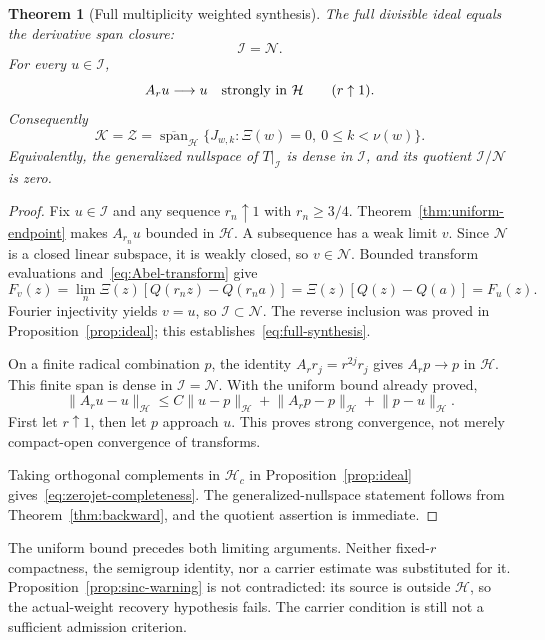 \documentclass[11pt,a4paper]{article}
\numberwithin{equation}{section}
\newtheorem{theorem}{Theorem}[section]
\theoremstyle{definition}
\theoremstyle{remark}
\newcommand{\Hh}{\mathcal H}
\newcommand{\Nn}{\mathcal N}
\newcommand{\Ii}{\mathcal I}
\newcommand{\Zz}{\mathcal Z}
\newcommand{\Kk}{\mathcal K}
\newcommand{\norm}[1]{\lVert #1\rVert}
\newcommand{\cl}{\overline{\operatorname{span}}}
\begin{document}
\begin{theorem}[Full multiplicity weighted synthesis]\label{thm:full-synthesis}
The full divisible ideal equals the derivative span closure:
\begin{equation}\label{eq:full-synthesis}
 \Ii=\Nn.
\end{equation}
For every $u\in\Ii$,
\begin{equation}\label{eq:strong-Abel}
 A_ru\longrightarrow u\quad\hbox{strongly in }\Hh
 \qquad(r\uparrow1).
\end{equation}
Consequently
\begin{equation}\label{eq:zerojet-completeness}
 \Kk=\Zz
 =\cl_{\Hh}\{J_{w,k}:\Xi(w)=0,\ 0\le k<\nu(w)\}.
\end{equation}
Equivalently, the generalized nullspace of $T|_{\Ii}$ is dense in $\Ii$, and its quotient $\Ii/\Nn$ is zero.
\end{theorem}
\begin{proof}
Fix $u\in\Ii$ and any sequence $r_n\uparrow1$ with $r_n\ge3/4$. Theorem~\ref{thm:uniform-endpoint} makes $A_{r_n}u$ bounded in $\Hh$. A subsequence has a weak limit $v$. Since $\Nn$ is a closed linear subspace, it is weakly closed, so $v\in\Nn$. Bounded transform evaluations and~\eqref{eq:Abel-transform} give
\[
 F_v(z)=\lim_n\Xi(z)[Q(r_nz)-Q(r_na)]
       =\Xi(z)[Q(z)-Q(a)]=F_u(z).
\]
Fourier injectivity yields $v=u$, so $\Ii\subset\Nn$. The reverse inclusion was proved in Proposition~\ref{prop:ideal}; this establishes~\eqref{eq:full-synthesis}.

On a finite radical combination $p$, the identity $A_rr_j=r^{2j}r_j$ gives $A_rp\to p$ in $\Hh$. This finite span is dense in $\Ii=\Nn$. With the uniform bound already proved,
\[
 \norm{A_ru-u}_{\Hh}
 \le C\norm{u-p}_{\Hh}
       +\norm{A_rp-p}_{\Hh}+\norm{p-u}_{\Hh}.
\]
First let $r\uparrow1$, then let $p$ approach $u$. This proves strong convergence, not merely compact-open convergence of transforms.

Taking orthogonal complements in $\Hh_c$ in Proposition~\ref{prop:ideal} gives~\eqref{eq:zerojet-completeness}. The generalized-nullspace statement follows from Theorem~\ref{thm:backward}, and the quotient assertion is immediate.
\end{proof}

The uniform bound precedes both limiting arguments. Neither fixed-$r$ compactness, the semigroup identity, nor a carrier estimate was substituted for it. Proposition~\ref{prop:sinc-warning} is not contradicted: its source is outside $\Hh$, so the actual-weight recovery hypothesis fails. The carrier condition is still not a sufficient admission criterion.
\end{document}
